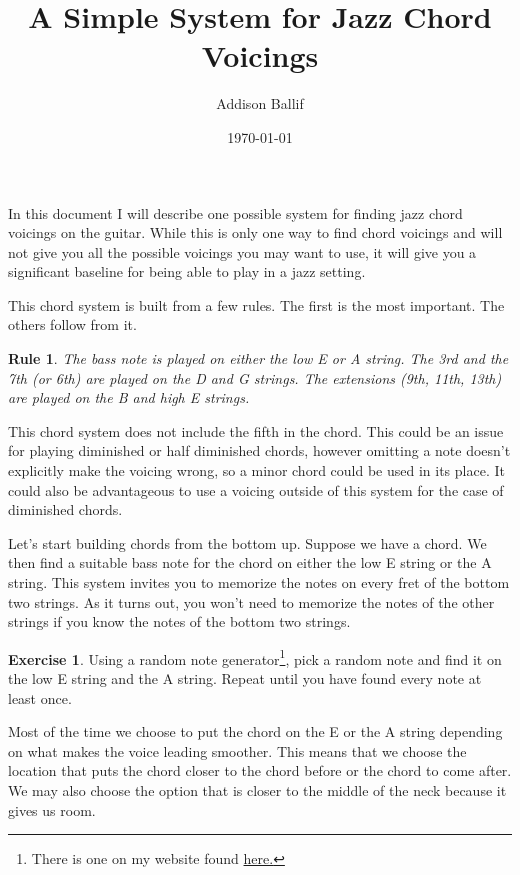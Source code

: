 \documentclass[12pt]{article}
\title{A Simple System for Jazz Chord Voicings}
\author{Addison Ballif}
\date{\today}
\newtheorem{nrule}{Rule}
\theoremstyle{definition}
\newtheorem{exercise}{Exercise}
\begin{document}
\maketitle

In this document I will describe one possible system for finding jazz chord voicings on the guitar. While this is only one way to find chord voicings and will not give you all the possible voicings you may want to use, it will give you a significant baseline for being able to play in a jazz setting. 

This chord system is built from a few rules. The first is the most important. The others follow from it. 

\begin{nrule}
The bass note is played on either the low E or A string. 
The 3rd and the 7th (or 6th) are played on the D and G strings. 
The extensions (9th, 11th, 13th) are played on the B and high E strings. 
\end{nrule}

This chord system does not include the fifth in the chord. This could be an issue for playing diminished or half diminished chords, however omitting a note doesn't explicitly make the voicing wrong, so a minor chord could be used in its place. 
It could also be advantageous to use a voicing outside of this system for the case of diminished chords. 

Let's start building chords from the bottom up. 
Suppose we have a chord. We then find a suitable bass note for the chord on either the low E string or the A string. This system invites you to memorize the notes on every fret of the bottom two strings. As it turns out, you won't need to memorize the notes of the other strings if you know the notes of the bottom two strings. 

\begin{exercise}
Using a random note generator\footnote{There is one on my website found \href{https://ahballif.github.io/AddisonGuitarResources/drones.html}{here.}},
pick a random note and find it on the low E string and the A string. Repeat until you have found every note at least once. 
\end{exercise}

Most of the time we choose to put the chord on the E or the A string depending on what makes the voice leading smoother. This means that we choose the location that puts the chord closer to the chord before or the chord to come after. We may also choose the option that is closer to the middle of the neck because it gives us room. 
\end{document}
